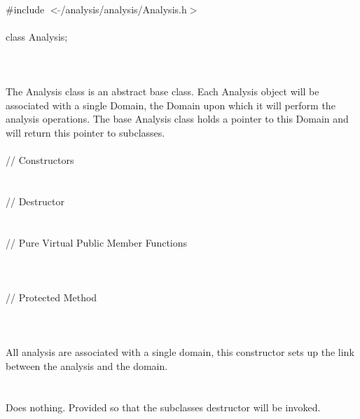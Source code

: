 
   \\
\indent \#include $<\tilde{ }$/analysis/analysis/Analysis.h$>$  \\

  \\
\indent class Analysis;  \\

 \\
 \\

 \\ 
\indent The Analysis class is an abstract base class. Each Analysis
object will be associated with a single Domain, the Domain upon which
it will perform the analysis operations. The base Analysis class holds
a pointer to this Domain and will return this pointer to subclasses. \\

 \\ 
\indent // Constructors  \\
\\  \\
\indent // Destructor \\
\\ \\
\indent // Pure Virtual Public Member Functions \\ 
 \\
 \\ \\
\indent // Protected Method \\
 \\


\\ \\ 
All analysis are associated with a single domain, this constructor
sets up the link between the analysis and the domain. \\

 \\
\\ 
Does nothing. Provided so that the subclasses destructor will be
invoked. \\

